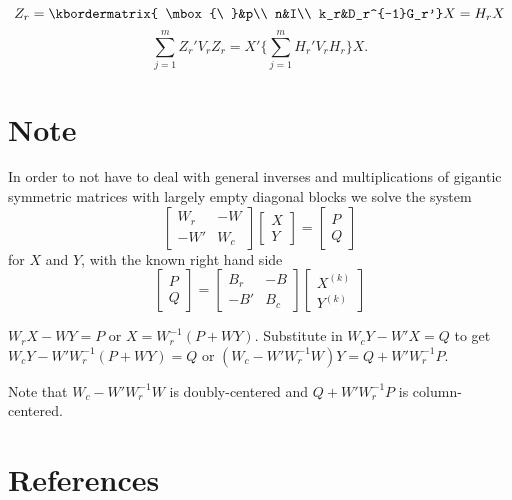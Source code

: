 \documentclass[
  12pt,
]{article}
\begin{document}
\[
Z_r=
\kbordermatrix{
\mbox{\ }&p\\
n&I\\
k_r&D_r^{-1}G_r'}X=H_rX
\]
\[
\sum_{j=1}^m Z_r'V_rZ_r=X'\{\sum_{j=1}^mH_r'V_rH_r\}X.
\]

\section{Note}\label{note}

In order to not have to deal with general inverses and multiplications of gigantic symmetric matrices with largely empty diagonal blocks we solve the system
\[
\begin{bmatrix}
W_r&-W\\
-W'&W_c
\end{bmatrix}
\begin{bmatrix}
X\\Y
\end{bmatrix}
=
\begin{bmatrix}
P\\Q
\end{bmatrix}
\]
for \(X\) and \(Y\), with the known right hand side
\[
\begin{bmatrix}P\\Q\end{bmatrix}=
\begin{bmatrix}
B_r&-B\\
-B'&B_c
\end{bmatrix}
\begin{bmatrix}
X^{(k)}\\Y^{(k)}
\end{bmatrix}
\]

\(W_rX-WY=P\) or \(X=W_r^{-1}(P+WY)\). Substitute in \(W_cY-W'X=Q\)
to get \(W_cY-W'W_r^{-1}(P+WY)=Q\) or \((W_c-W'W_r^{-1}W)Y=Q+W'W_r^{-1}P\).

Note that \(W_c-W'W_r^{-1}W\) is doubly-centered and \(Q+W'W_r^{-1}P\) is column-centered.

\section*{References}\label{references}
\end{document}
